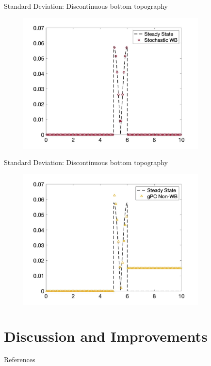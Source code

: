 \documentclass[
    pdf,
    11pt,
    xcolor={svgnames},
  ]{beamer}
\begin{document}
\begin{frame}{Standard Deviation: Discontinuous bottom topography}
    \begin{figure}
    \centering
    \includegraphics[width=0.85\textwidth]{./Figures/burgers_dis_wb_sd}
    \end{figure}
\end{frame}
\begin{frame}{Standard Deviation: Discontinuous bottom topography}
    \begin{figure}
    \centering
    \includegraphics[width=0.85\textwidth]{./Figures/burgers_dis_non_sd}
    \end{figure}
\end{frame}

\section{Discussion and Improvements}

\begin{frame}{References}
\printbibliography
\end{frame}
\end{document}
